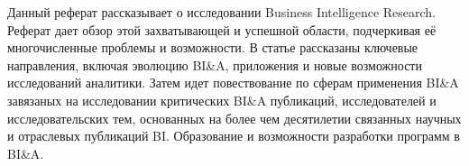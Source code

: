 Данный реферат рассказывает о исследовании Business Intelligence Research. Реферат дает обзор этой
захватывающей и успешной области, подчеркивая её многочисленные проблемы и возможности. В статье рассказаны ключевые направления, включая эволюцию BI\&A, приложения и
новые возможности исследований аналитики. Затем идет повествование по сферам применения BI\&A завязаных на исследовании критических BI\&A публикаций,
исследователей и исследовательских тем, основанных на более чем десятилетии
связанных научных и отраслевых публикаций BI. Образование
и возможности разработки программ в BI\&A.